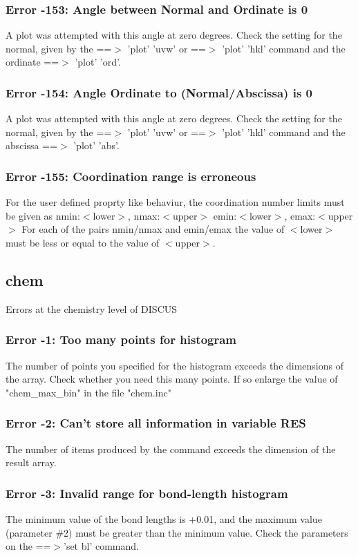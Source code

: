 \subsubsection{Error -153: Angle between Normal and Ordinate is 0}
\par
A plot was attempted with this angle 
at zero degrees. Check the setting for the 
normal, given by the ==$> $ 'plot' 'uvw' or 
==$> $ 'plot' 'hkl' command and the ordinate 
==$> $ 'plot' 'ord'. 
\subsubsection{Error -154: Angle Ordinate to (Normal/Abscissa) is 0}
\par
A plot was attempted with this angle 
at zero degrees. Check the setting for the 
normal, given by the ==$> $ 'plot' 'uvw' or 
==$> $ 'plot' 'hkl' command and the abscissa 
==$> $ 'plot' 'abs'. 
\subsubsection{Error -155: Coordination range is erroneous}
\par
For the user defined proprty like behaviur, the 
coordination number limits must be given as 
nmin:$ <$lower$> $, nmax:$ <$upper$> $ 
emin:$ <$lower$> $, emax:$ <$upper$> $ 
For each of the pairs nmin/nmax and emin/emax 
the value of $ <$lower$> $ must be less or equal to 
the value of $ <$upper$> $. 
\subsection*{chem}
Errors at the chemistry level of DISCUS 
\par
\subsubsection{Error -1: Too many points for histogram}
\par
The number of points you specified for the histogram exceeds the 
dimensions of the array. 
Check whether you need this many points. If so enlarge the value 
of "chem\_max\_bin" in the file "chem.inc" 
\subsubsection{Error -2: Can't store all information in variable RES}
\par
The number of items produced by the command exceeds the dimension of the 
result array. 
\subsubsection{Error -3: Invalid range for bond-length histogram}
\par
The minimum value of the bond lengths is +0.01, and the maximum 
value (parameter \#2) must be greater than the minimum value. 
Check the parameters on the ==$> $'set bl' command. 
